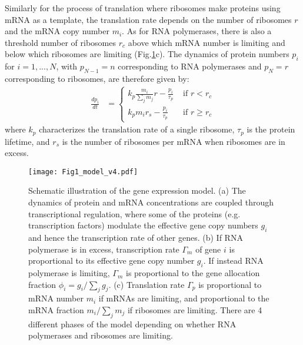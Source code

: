 \documentclass[10pt]{article}
\begin{document}
Similarly for the process of translation where ribosomes make proteins using mRNA as a template, the translation rate depends on the number of ribosomes $r$ and the mRNA copy number $m_i$. As for RNA polymerases, there is also a threshold number of ribosomes $r_c$ above which mRNA number is limiting and below which ribosomes are limiting (Fig.\ref{fig:model}c). The dynamics of protein numbers $p_i$ for $i = 1,..., N$, with $p_{N-1} = n$ corresponding to RNA polymerases and $p_N = r$ corresponding to ribosomes, are therefore given by:
\begin{equation}
\begin{split}
    \frac{dp_i}{dt} &= \begin{cases}
    k_p \frac{m_i}{\sum_j m_j} r - \frac{p_i}{\tau_p} & \text{ if $r<r_c$}
    \\
    k_p m_i r_s - \frac{p_i}{\tau_p} & \text{ if $r \geq r_c$}
    \end{cases}
    \label{eqn:dpdt}
\end{split}
\end{equation}
where $k_p$ characterizes the translation rate of a single ribosome, $\tau_p$ is the protein lifetime, and $r_s$ is the number of ribosomes per mRNA when ribosomes are in excess.

\begin{figure}[ht]
    \centering
	\texttt{[image: Fig1\_model\_v4.pdf]}
    \caption{Schematic illustration of the gene expression model. (a) The dynamics of protein and mRNA concentrations are coupled through transcriptional regulation, where some of the proteins (e.g. transcription factors) modulate the effective gene copy numbers $g_i$ and hence the transcription rate of other genes. (b) If RNA polymerase is in excess, transcription rate $\Gamma_m$ of gene $i$ is proportional to its effective gene copy number $g_i$. If instead RNA polymerase is limiting, $\Gamma_m$ is proportional to the gene allocation fraction $\phi_i = g_i/\sum_j g_j$. (c) Translation rate $\Gamma_p$ is proportional to mRNA number $m_i$ if mRNAs are limiting, and proportional to the mRNA fraction $m_i/\sum_j m_j$ if ribosomes are limiting. There are 4 different phases of the model depending on whether RNA polymerases and ribosomes are limiting.}
    \label{fig:model}
\end{figure}
\end{document}
